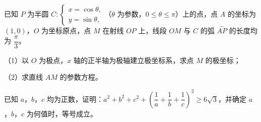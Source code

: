 \endgroup
\begin{question}
已知 $P$ 为半圆 $C:\begin{cases}x=\cos\theta,\\y=\sin\theta,\end{cases}$（$\theta$ 为参数，$0\leqslant\theta\leqslant\pi$）上的点，点 $A$ 的坐标为 $(1,0)$，$O$ 为坐标原点，点 $M$ 在射线 $OP$ 上，线段 $OM$ 与 $C$ 的弧 $\overset{\frown}{AP}$ 的长度均为 $\dfrac{\pi}{3}$。

（1）以 $O$ 为极点，$x$ 轴的正半轴为极轴建立极坐标系，求点 $M$ 的极坐标；

（2）求直线 $AM$ 的参数方程。

\end{question}
\begin{question}
已知 $a$，$b$，$c$ 均为正数，证明：$a^2+b^2+c^2+\left(\dfrac1a+\dfrac1b+\dfrac1c\right)^2\geqslant6\sqrt3$，并确定 $a$，$b$，$c$ 为何值时，等号成立。

\end{question}